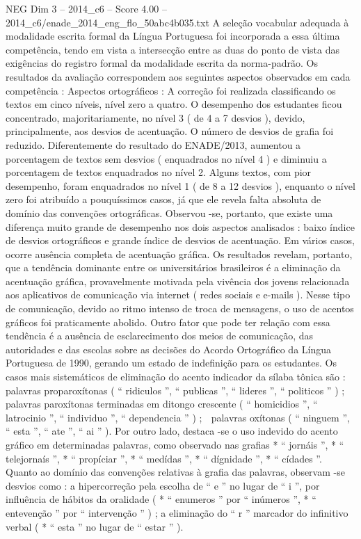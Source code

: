\begin{textsample}{NEG Dim 3 – 2014\_c6 – Score 4.00 – 2014\_c6/enade\_2014\_eng\_flo\_50abc4b035.txt}
A seleção vocabular adequada à modalidade escrita formal da Língua Portuguesa foi incorporada a essa última competência, tendo em vista a intersecção entre as duas do ponto de vista das exigências do registro formal da modalidade escrita da norma-padrão.
Os resultados da avaliação correspondem aos seguintes aspectos observados em cada competência : Aspectos ortográficos : A correção foi realizada classificando os textos em cinco níveis, nível zero a quatro.
O desempenho dos estudantes ficou concentrado, majoritariamente, no nível 3 ( de 4 a 7 desvios ), devido, principalmente, aos desvios de acentuação.
O número de desvios de grafia foi reduzido.
Diferentemente do resultado do ENADE/2013, aumentou a porcentagem de textos sem desvios ( enquadrados no nível 4 ) e diminuiu a porcentagem de textos enquadrados no nível 2.
Alguns textos, com pior desempenho, foram enquadrados no nível 1 ( de 8 a 12 desvios ), enquanto o nível zero foi atribuído a pouquíssimos casos, já que ele revela falta absoluta de domínio das convenções ortográficas.
Observou -se, portanto, que existe uma diferença muito grande de desempenho nos dois aspectos analisados : baixo índice de desvios ortográficos e grande índice de desvios de acentuação.
Em vários casos, ocorre ausência completa de acentuação gráfica.
Os resultados revelam, portanto, que a tendência dominante entre os universitários brasileiros é a eliminação da acentuação gráfica, provavelmente motivada pela vivência dos jovens relacionada aos aplicativos de comunicação via internet ( redes sociais e e-mails ).
Nesse tipo de comunicação, devido ao ritmo intenso de troca de mensagens, o uso de acentos gráficos foi praticamente abolido.
Outro fator que pode ter relação com essa tendência é a ausência de esclarecimento dos meios de comunicação, das autoridades e das escolas sobre as decisões do Acordo Ortográfico da Língua Portuguesa de 1990, gerando um estado de indefinição para os estudantes.
Os casos mais sistemáticos de eliminação do acento indicador da sílaba tônica são :  palavras proparoxítonas ( “ ridiculos ”, “ publicas ”, “ lideres ”, “ politicos ” ) ;  palavras paroxítonas terminadas em ditongo crescente ( “ homicidios ”, “ latrocinio ”, “ individuo ”, “ dependencia ” ) ;  palavras oxítonas ( “ ninguem ”, “ esta ”, “ ate ”, “ ai ” ).
Por outro lado, destaca -se o uso indevido do acento gráfico em determinadas palavras, como observado nas grafias * “ jornáis ”, * “ telejornaís ”, * “ propíciar ”, * “ medídas ”, * “ dígnidade ”, * “ cídades ”.
Quanto ao domínio das convenções relativas à grafia das palavras, observam -se desvios como : a hipercorreção pela escolha de “ e ” no lugar de “ i ”, por influência de hábitos da oralidade ( * “ enumeros ” por “ inúmeros ”, * “ entevenção ” por “ intervenção ” ) ; a eliminação do “ r ” marcador do infinitivo verbal ( * “ esta ” no lugar de “ estar ” ).

\end{textsample}
